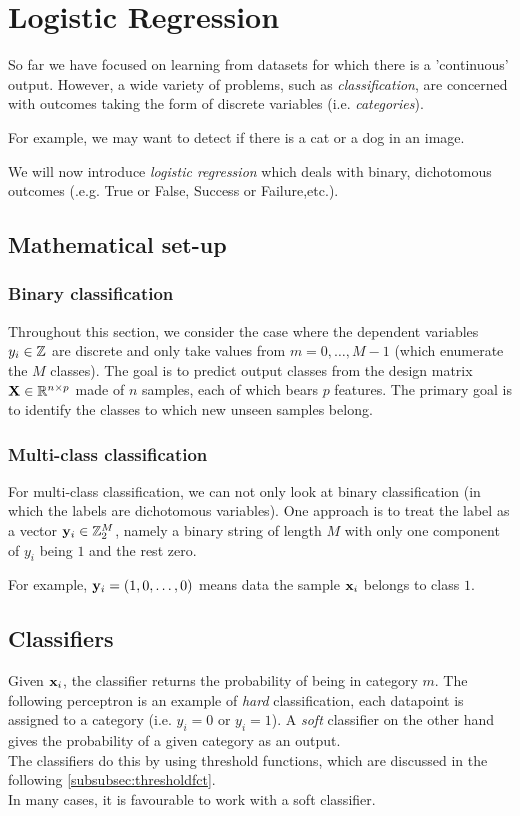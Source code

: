 \section{Logistic Regression}
\label{sec:logisticRegression}
So far we have focused on learning from datasets for which there is a ’continuous’ output. However, a wide variety of problems, such as \emph{classification}, are concerned with outcomes taking the form of discrete variables (i.e. \emph{categories}).
\begin{example}
	For example, we may want to detect if there is a cat or a dog in an image.
\end{example}
We will now introduce \emph{logistic regression} which deals with binary, dichotomous outcomes (.e.g. True or False, Success or Failure,etc.).
\subsection{Mathematical set-up}
\subsubsection{Binary classification}
\label{subsubsec:classBinary}
Throughout this section, we consider the case where the dependent variables $y_i\in \mathbb{Z}$ are discrete and only take values from $m=0,\dots,M-1$ (which enumerate the $M$ classes). The goal is to predict output classes from the design matrix $\mathbf{X}\in \mathbb{R}^{n\times  p}$ made of $n$ samples, each of which bears $p$ features. The primary goal is to identify the classes to which new unseen samples belong.
\subsubsection{Multi-class classification}
\label{subsubsec:classMultiClass}
For multi-class classification, we can not only look at binary classification (in which the labels are dichotomous variables). One approach is to treat the label as a vector $\mathbf{y}_i\in \mathbb{Z}^M_2$, namely a binary string of length $M$ with only one component of $y_i$ being $1$ and the rest zero.
\begin{example}
	For example, $\mathbf{y}_i=(1,0,\dots,0)$ means data the sample $\mathbf{x}_i$ belongs to class $1$.
\end{example}




\subsection{Classifiers}
Given $\mathbf{x}_i$, the classifier returns the probability of being in category $m$. The following perceptron is an example of \emph{hard} classification, each datapoint is assigned to a category (i.e. $y_i=0$ or $y_i=1$). A \emph{soft} classifier on the other hand gives the probability of a given category as an output.\\
The classifiers do this by using threshold functions, which are discussed in the following \ref{subsubsec:thresholdfct}.\\
In many cases, it is favourable to work with a soft classifier.

